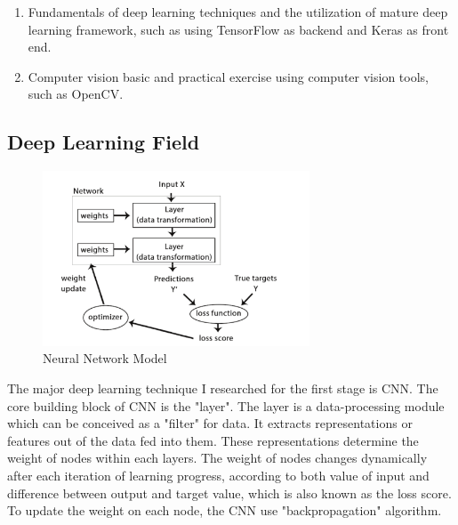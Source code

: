 \documentclass[titlepage]{article}
\begin{document}
\begin{enumerate}
\item Fundamentals of deep learning techniques and the utilization of mature deep
learning framework, such as using TensorFlow as backend and Keras as front end.
\item Computer vision basic and practical exercise using computer vision tools,
such as OpenCV.
\end{enumerate}

\subsection{Deep Learning Field}
\label{sec:org47aef59}
\begin{figure}[htbp]
\centering
\includegraphics[width=300]{cnn_model.PNG}
\caption{Neural Network Model}
\end{figure}
\newpage

The major deep learning technique I researched for the first stage is CNN.
The core building block of CNN is the "layer". The layer is a data-processing
module which can be conceived as a "filter" for data. It extracts
representations or features out of the data fed into them. These
representations determine the weight of nodes within each layers. The weight
of nodes changes dynamically after each iteration of learning progress,
according to both value of input and difference between output and target
value, which is also known as the loss score. To update the weight on each
node, the CNN use "backpropagation" algorithm.
\end{document}

